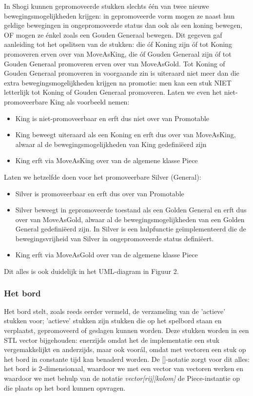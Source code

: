 \documentclass[a4paper,11pt,oneside, titlepage]{article}
\begin{document}
In Shogi kunnen gepromoveerde stukken slechts \'e\'en van twee nieuwe bewegingsmogelijkheden krijgen: in gepromoveerde vorm mogen ze naast hun geldige bewegingen in ongepromoveerde status dan ook als een koning bewegen, OF mogen ze \'enkel zoals een Gouden Generaal bewegen. Dit gegeven gaf aanleiding tot het opslitsen van de stukken: die \'of Koning zijn \'of tot Koning promoveren erven over van MoveAsKing, die \'of Gouden Generaal zijn \'of tot Gouden Generaal promoveren erven over van MoveAsGold. Tot Koning of Gouden Generaal promoveren in voorgaande zin is uiteraard niet meer dan die extra bewegingsmogelijkheden krijgen na promotie: men kan een stuk NIET letterlijk tot Koning of Gouden Generaal promoveren.
\newline \newline
Laten we even het niet-promoveerbare King als voorbeeld nemen:
	\begin{itemize}
		\item King is niet-promoveerbaar en erft dus niet over van Promotable
		\item King beweegt uiteraard als een Koning en erft dus over van MoveAsKing, alwaar al de bewegingsmogelijkheden van King gedefini\"eerd zijn
		\item King erft via MoveAsKing over van de algemene klasse Piece
 	\end{itemize}
Laten we hetzelfde doen voor het promoveerbare Silver (General):
	\begin{itemize}
		\item Silver is promoveerbaar en erft dus over van Promotable
		\item Silver beweegt in gepromoveerde toestand als een Golden General en erft dus over van MoveAsGold, alwaar al de bewegingsmogelijkheden van een Golden General gedefini\"eerd zijn. In Silver is een hulpfunctie ge\"implementeerd die de bewegingsvrijheid van Silver in ongepromoveerde status defini\"eert.
		\item King erft via MoveAsGold over van de algemene klasse Piece
 	\end{itemize}
Dit alles is ook duidelijk in het UML-diagram in Figuur 2.
\subsubsection{Het bord}
Het bord stelt, zoals reeds eerder vermeld, de verzameling van de 'actieve' stukken voor; 'actieve' stukken zijn stukken die op het spelbord staan en verplaatst, gepromoveerd of geslagen kunnen worden. Deze stukken worden in een STL vector bijgehouden: enerzijds omdat het de implementatie een stuk vergemakkelijkt en anderzijds, maar ook voor\'al, omdat met vectoren een stuk op het bord in constante tijd kan benaderd worden. De []-notatie zorgt voor dit alles: het bord is 2-dimensionaal, waardoor we met een vector van vectoren werken en waardoor we met behulp van de notatie \emph{vector[rij][kolom]} de Piece-instantie op die plaats op het bord kunnen opvragen.
\end{document}
